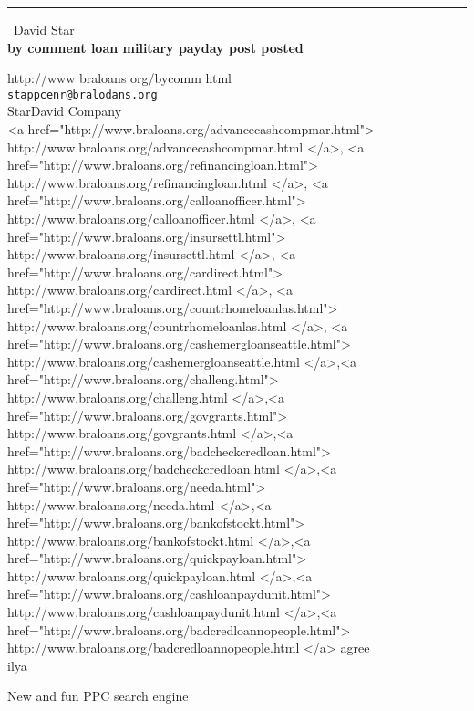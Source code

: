 \documentclass{report}
\begin{document}
\begin{center}
\rule{6in}{1pt} \
{\large David Star \\
{\bf by comment loan military payday post posted}}

http://www braloans org/bycomm html
\\
{\tt stappcenr@bralodans.org}\\
 StarDavid Company\\
<a href="http://www.braloans.org/advancecashcompmar.html"> http://www.braloans.org/advancecashcompmar.html </a>, <a href="http://www.braloans.org/refinancingloan.html"> http://www.braloans.org/refinancingloan.html </a>, <a href="http://www.braloans.org/calloanofficer.html"> http://www.braloans.org/calloanofficer.html </a>, <a href="http://www.braloans.org/insursettl.html"> http://www.braloans.org/insursettl.html </a>, <a href="http://www.braloans.org/cardirect.html"> http://www.braloans.org/cardirect.html </a>, <a href="http://www.braloans.org/countrhomeloanlas.html"> http://www.braloans.org/countrhomeloanlas.html </a>, <a href="http://www.braloans.org/cashemergloanseattle.html"> http://www.braloans.org/cashemergloanseattle.html </a>,<a href="http://www.braloans.org/challeng.html"> http://www.braloans.org/challeng.html </a>,<a href="http://www.braloans.org/govgrants.html"> http://www.braloans.org/govgrants.html </a>,<a href="http://www.braloans.org/badcheckcredloan.html"> http://www.braloans.org/badcheckcredloan.html </a>,<a href="http://www.braloans.org/needa.html"> http://www.braloans.org/needa.html </a>,<a href="http://www.braloans.org/bankofstockt.html"> http://www.braloans.org/bankofstockt.html </a>,<a href="http://www.braloans.org/quickpayloan.html"> http://www.braloans.org/quickpayloan.html </a>,<a href="http://www.braloans.org/cashloanpaydunit.html"> http://www.braloans.org/cashloanpaydunit.html </a>,<a href="http://www.braloans.org/badcredloannopeople.html"> http://www.braloans.org/badcredloannopeople.html </a> agree\\
	ilya\end{center}

New and fun PPC search engine
\end{document}
